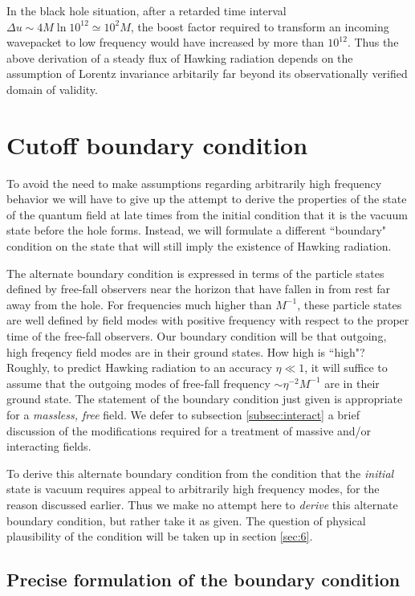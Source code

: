 In the black hole situation, after a retarded time interval
$\Delta u\sim 4M \ln 10^{12}\simeq 10^2 M$,
the boost factor required to transform
an incoming wavepacket to low frequency would have increased
by more than $10^{12}$. Thus the above derivation of a
steady flux of Hawking radiation depends on the assumption
of Lorentz invariance arbitarily far beyond its observationally
verified domain of validity.
\section{Cutoff boundary condition}
\label{sec:4}

To avoid the need to make assumptions regarding arbitrarily
high frequency behavior we will have to give up the attempt
to derive the properties of the state of the quantum field
at late times from the initial condition that it is the
vacuum state before the hole forms. Instead, we will formulate
a different ``boundary" condition on the state that will
still imply the existence of Hawking radiation.

The alternate boundary condition is expressed in terms of
the particle states defined by free-fall observers near the
horizon that have fallen in from rest far away from the
hole. For frequencies much higher than $M^{-1}$, these particle
states are well defined by field modes with positive
frequency with respect to the proper time of the free-fall
observers. Our boundary condition will be that outgoing,
high freqency field modes are in their ground states. How
high is ``high"? Roughly, to predict Hawking radiation
to an accuracy $\eta\ll 1$, it will suffice to assume that the
outgoing modes of free-fall frequency
$\sim \eta^{-2}M^{-1}$ are in their ground state.
The statement of the boundary condition just given is
appropriate for a {\it massless, free} field. We defer to
subsection
\ref{subsec:interact} a brief discussion of the modifications
required for a treatment of massive and/or interacting fields.

To derive this alternate boundary condition from the condition
that the {\it initial} state is vacuum requires appeal to
arbitrarily high frequency modes, for the reason discussed
earlier. Thus we make no attempt here to {\it derive} this
alternate boundary condition, but rather take it as given.
The question of physical plausibility of the condition will
be taken up in section \ref{sec:6}.

\subsection{Precise formulation of the boundary condition}
\label{subsec:precise}

